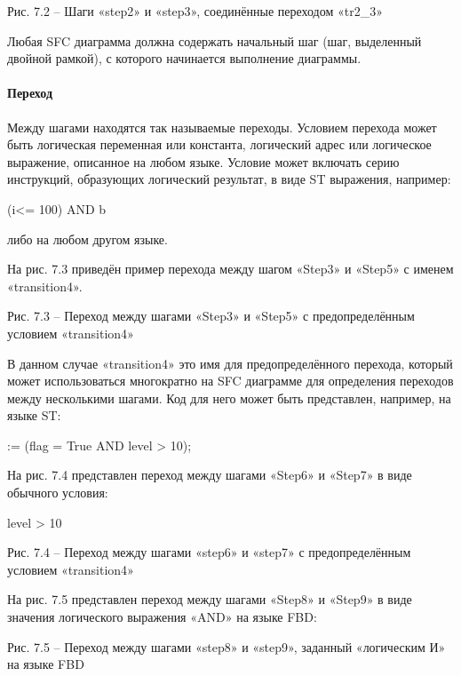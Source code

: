 \documentclass[letterpaper,10pt,russian]{sphinxmanual}
\begin{document}

Рис. 7.2 – Шаги «step2» и «step3», соединённые переходом «tr2\_3»

Любая SFC диаграмма должна содержать начальный шаг (шаг, выделенный
двойной рамкой), с которого начинается выполнение диаграммы.


\paragraph{Переход}
\label{iec_guide/sfc_guide:id4}
Между шагами находятся так называемые переходы. Условием перехода может
быть логическая переменная или константа, логический адрес или
логическое выражение, описанное на любом языке. Условие может включать
серию инструкций, образующих логический результат, в виде ST выражения,
например:

(i\textless{}= 100) AND b

либо на любом другом языке.

На рис. 7.3 приведён пример перехода между шагом «Step3» и «Step5» с
именем «transition4».


Рис. 7.3 – Переход между шагами «Step3» и «Step5» с предопределённым
условием «transition4»

В данном случае «transition4» это имя для предопределённого перехода,
который может использоваться многократно на SFC диаграмме для
определения переходов между несколькими шагами. Код для него может быть
представлен, например, на языке ST:

:= (flag = True AND level \textgreater{} 10);

На рис. 7.4 представлен переход между шагами «Step6» и «Step7» в виде
обычного условия:

level \textgreater{} 10


Рис. 7.4 – Переход между шагами «step6» и «step7» с предопределённым
условием «transition4»

На рис. 7.5 представлен переход между шагами «Step8» и «Step9» в виде
значения логического выражения «AND» на языке FBD:


Рис. 7.5 – Переход между шагами «step8» и «step9», заданный «логическим
И» на языке FBD
\end{document}
